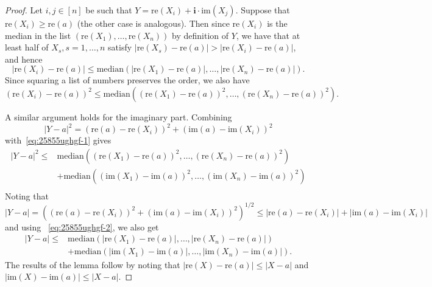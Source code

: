 \begin{proof}
Let $i, j\in [n]$ be such that $Y=\text{re}(X_i)+\mathbf{i}\cdot \text{im}(X_j)$. 
Suppose that $\text{re}(X_i)\geq \text{re}(a)$ (the other case is analogous). Then since $\text{re}(X_i)$  is the median in the list $(\text{re}(X_1),\ldots, \text{re}(X_n))$ by definition of $Y$, we have that at least half of $X_s, s=1,\ldots, n$ satisfy $|\text{re}(X_s)-\text{re}(a)|>|\text{re}(X_i)-\text{re}(a)|$, and hence 
\begin{equation}\label{eq:25855ughgf-1}
|\text{re}(X_i)-\text{re}(a)|\leq \text{median}(|\text{re}(X_1)-\text{re}(a)|,\ldots, |\text{re}(X_n)-\text{re}(a)|).
\end{equation}
Since squaring a list of numbers preserves the order, we also have
\begin{equation}\label{eq:25855ughgf-2}
(\text{re}(X_i)-\text{re}(a))^2\leq \text{median}((\text{re}(X_1)-\text{re}(a))^2,\ldots, (\text{re}(X_n)-\text{re}(a))^2).
\end{equation}

 A similar argument holds for the imaginary part.
Combining
$$
|Y-a|^2=(\text{re}(a)-\text{re}(X_i))^2+(\text{im}(a)-\text{im}(X_i))^2
$$
with~\eqref{eq:25855ughgf-1} gives 
\begin{equation*}
\begin{split}
|Y-a|^2\leq &\text{median} ((\text{re}(X_1)-\text{re}(a))^2,\ldots, (\text{re}(X_n)-\text{re}(a))^2)\\
&+\text{median} ((\text{im}(X_1)-\text{im}(a))^2,\ldots, (\text{im}(X_n)-\text{im}(a))^2)\\
\end{split}
\end{equation*}
Noting that 
$$
|Y-a|=((\text{re}(a)-\text{re}(X_i))^2+(\text{im}(a)-\text{im}(X_i))^2)^{1/2}\leq |\text{re}(a)-\text{re}(X_i)|+|\text{im}(a)-\text{im}(X_i)|
$$
and using ~\eqref{eq:25855ughgf-2}, we also get 
\begin{equation*}
\begin{split}
|Y-a|\leq &\text{median}(|\text{re}(X_1)-\text{re}(a)|,\ldots, |\text{re}(X_n)-\text{re}(a)|)\\
&+\text{median} (|\text{im}(X_1)-\text{im}(a)|,\ldots, |\text{im}(X_n)-\text{im}(a)|).
\end{split}
\end{equation*}
The results of the lemma follow by noting that $|\text{re}(X)-\text{re}(a)|\leq |X-a|$ and $|\text{im}(X)-\text{im}(a)|\leq |X-a|$.
\end{proof}


